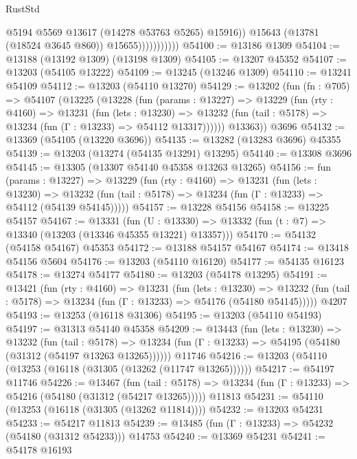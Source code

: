 \begin{lexlean}{RustStd}
\begin{coremodule}
                              @5194
                              @5569
                              @13617
                              (@14278 @53763 @5265)
                              @15916))
                          @15643
                          (@13781 (@18524 @3645 @860))
                          @15655)))))))))))
@54100 := @13186 @1309
@54104 := @13188 (@13192 @1309) (@13198 @1309)
@54105 := @13207 @45352
@54107 := @13203 (@54105 @13222)
@54109 := @13245 (@13246 @1309)
@54110 := @13241 @54109
@54112 := @13203 (@54110 @13270)
@54129 := @13202
    (fun (fn : @705) =>
    @54107
      (@13225
        (@13228
          (fun (params : @13227) =>
          @13229
            (fun (rty : @4160) =>
            @13231
              (fun (lets : @13230) =>
              @13232 (fun (tail : @5178) => @13234 (fun (Γ : @13233) => @54112 @13317))))))
        @13363))
    @3696
@54132 := @13369 (@54105 (@13220 @3696))
@54135 := @13282 (@13283 @3696) @45355
@54139 := @13203 (@13274 (@54135 @13291) @13295)
@54140 := @13308 @3696
@54145 := @13305 (@13307 @54140 @45358 @13263 @13265)
@54156 := fun (params : @13227) =>
  @13229
    (fun (rty : @4160) =>
    @13231
      (fun (lets : @13230) =>
      @13232 (fun (tail : @5178) => @13234 (fun (Γ : @13233) => @54112 (@54139 @54145)))))
@54157 := @13228 @54156
@54158 := @13225 @54157
@54167 := @13331
    (fun (U : @13330) => @13332 (fun (t : @7) => @13340 (@13203 (@13346 @45355 @13221) @13357)))
@54170 := @54132 (@54158 @54167) @45353
@54172 := @13188 @54157 @54167
@54174 := @13418 @54156 @5604
@54176 := @13203 (@54110 @16120)
@54177 := @54135 @16123
@54178 := @13274 @54177
@54180 := @13203 (@54178 @13295)
@54191 := @13421
    (fun (rty : @4160) =>
    @13231
      (fun (lets : @13230) =>
      @13232 (fun (tail : @5178) => @13234 (fun (Γ : @13233) => @54176 (@54180 @54145)))))
    @4207
@54193 := @13253 (@16118 @31306)
@54195 := @13203 (@54110 @54193)
@54197 := @31313 @54140 @45358
@54209 := @13443
    (fun (lets : @13230) =>
    @13232
      (fun (tail : @5178) =>
      @13234 (fun (Γ : @13233) => @54195 (@54180 (@31312 (@54197 @13263 @13265))))))
    @11746
@54216 := @13203 (@54110 (@13253 (@16118 (@31305 (@13262 (@11747 @13265))))))
@54217 := @54197 @11746
@54226 := @13467
    (fun (tail : @5178) => @13234 (fun (Γ : @13233) => @54216 (@54180 (@31312 (@54217 @13265)))))
    @11813
@54231 := @54110 (@13253 (@16118 (@31305 (@13262 @11814))))
@54232 := @13203 @54231
@54233 := @54217 @11813
@54239 := @13485 (fun (Γ : @13233) => @54232 (@54180 (@31312 @54233))) @14753
@54240 := @13369 @54231
@54241 := @54178 @16193

\end{coremodule}
\end{lexlean}
